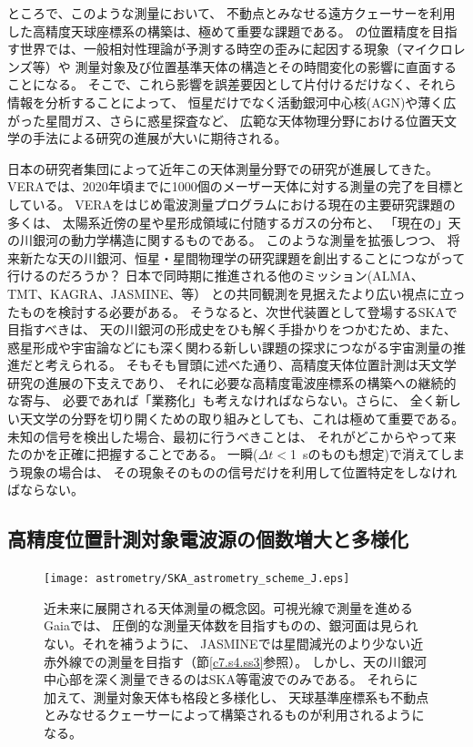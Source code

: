 ところで、このような測量において、
不動点とみなせる遠方クェーサーを利用した高精度天球座標系の構築は、極めて重要な課題である。
\uas の位置精度を目指す世界では、一般相対性理論が予測する時空の歪みに起因する現象（マイクロレンズ等）や
測量対象及び位置基準天体の構造とその時間変化の影響に直面することになる。
そこで、これら影響を誤差要因として片付けるだけなく、それら情報を分析することによって、
恒星だけでなく活動銀河中心核(AGN)や薄く広がった星間ガス、さらに惑星探査など、
広範な天体物理分野における位置天文学の手法による研究の進展が大いに期待される。

日本の研究者集団によって近年この天体測量分野での研究が進展してきた。
VERAでは、2020年頃までに1000個のメーザー天体に対する測量の完了を目標としている。
VERAをはじめ電波測量プログラムにおける現在の主要研究課題の多くは、
太陽系近傍の星や星形成領域に付随するガスの分布と、
「現在の」天の川銀河の動力学構造に関するものである。
このような測量を拡張しつつ、
将来新たな天の川銀河、恒星・星間物理学の研究課題を創出することにつながって行けるのだろうか？
日本で同時期に推進される他のミッション(ALMA、TMT、KAGRA、JASMINE、等）
との共同観測を見据えたより広い視点に立ったものを検討する必要がある。
そうなると、次世代装置として登場するSKAで目指すべきは、
天の川銀河の形成史をひも解く手掛かりをつかむため、また、
惑星形成や宇宙論などにも深く関わる新しい課題の探求につながる宇宙測量の推進だと考えられる。
そもそも冒頭に述べた通り、高精度天体位置計測は天文学研究の進展の下支えであり、
それに必要な高精度電波座標系の構築への継続的な寄与、
必要であれば「業務化」も考えなければならない。さらに、
全く新しい天文学の分野を切り開くための取り組みとしても、これは極めて重要である。
未知の信号を検出した場合、最初に行うべきことは、
それがどこからやって来たのかを正確に把握することである。
一瞬($\Delta t<$1~sのものも想定)で消えてしまう現象の場合は、
その現象そのものの信号だけを利用して位置特定をしなければならない。

\setcounter{subsection}{1}\subsection{高精度位置計測対象電波源の個数増大と多様化}\label{c7.s1.ss2}

\begin{figure}[t]
\begin{center}
\texttt{[image: astrometry/SKA\_astrometry\_scheme\_J.eps]}
\end{center}
\vspace{-7mm}
\caption{近未来に展開される天体測量の概念図。可視光線で測量を進めるGaiaでは、
圧倒的な測量天体数を目指すものの、銀河面は見られない。それを補うように、
JASMINEでは星間減光のより少ない近赤外線での測量を目指す（節\ref{c7.s4.ss3}参照）。
しかし、天の川銀河中心部を深く測量できるのはSKA等電波でのみである。
それらに加えて、測量対象天体も格段と多様化し、
天球基準座標系も不動点とみなせるクェーサーによって構築されるものが利用されるようになる。}\label{c7.s1.f2}
\end{figure}

